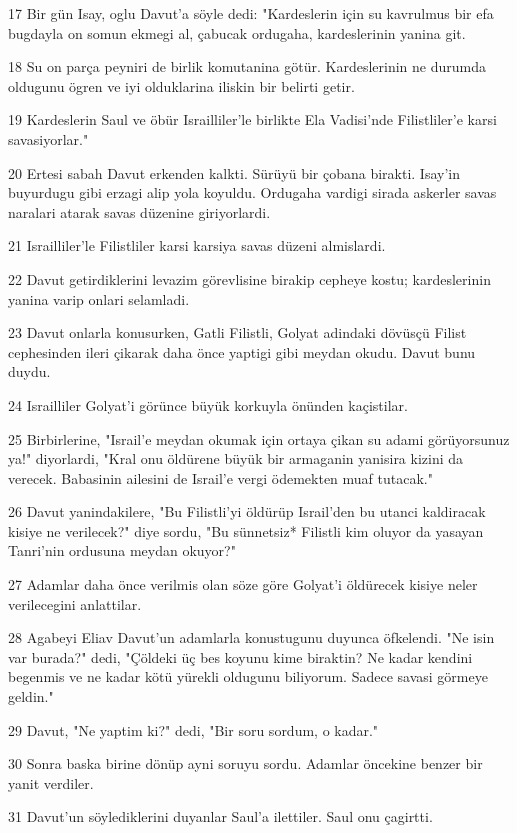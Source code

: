 \par 17 Bir gün Isay, oglu Davut'a söyle dedi: "Kardeslerin için su kavrulmus bir efa bugdayla on somun ekmegi al, çabucak ordugaha, kardeslerinin yanina git.
\par 18 Su on parça peyniri de birlik komutanina götür. Kardeslerinin ne durumda oldugunu ögren ve iyi olduklarina iliskin bir belirti getir.
\par 19 Kardeslerin Saul ve öbür Israilliler'le birlikte Ela Vadisi'nde Filistliler'e karsi savasiyorlar."
\par 20 Ertesi sabah Davut erkenden kalkti. Sürüyü bir çobana birakti. Isay'in buyurdugu gibi erzagi alip yola koyuldu. Ordugaha vardigi sirada askerler savas naralari atarak savas düzenine giriyorlardi.
\par 21 Israilliler'le Filistliler karsi karsiya savas düzeni almislardi.
\par 22 Davut getirdiklerini levazim görevlisine birakip cepheye kostu; kardeslerinin yanina varip onlari selamladi.
\par 23 Davut onlarla konusurken, Gatli Filistli, Golyat adindaki dövüsçü Filist cephesinden ileri çikarak daha önce yaptigi gibi meydan okudu. Davut bunu duydu.
\par 24 Israilliler Golyat'i görünce büyük korkuyla önünden kaçistilar.
\par 25 Birbirlerine, "Israil'e meydan okumak için ortaya çikan su adami görüyorsunuz ya!" diyorlardi, "Kral onu öldürene büyük bir armaganin yanisira kizini da verecek. Babasinin ailesini de Israil'e vergi ödemekten muaf tutacak."
\par 26 Davut yanindakilere, "Bu Filistli'yi öldürüp Israil'den bu utanci kaldiracak kisiye ne verilecek?" diye sordu, "Bu sünnetsiz* Filistli kim oluyor da yasayan Tanri'nin ordusuna meydan okuyor?"
\par 27 Adamlar daha önce verilmis olan söze göre Golyat'i öldürecek kisiye neler verilecegini anlattilar.
\par 28 Agabeyi Eliav Davut'un adamlarla konustugunu duyunca öfkelendi. "Ne isin var burada?" dedi, "Çöldeki üç bes koyunu kime biraktin? Ne kadar kendini begenmis ve ne kadar kötü yürekli oldugunu biliyorum. Sadece savasi görmeye geldin."
\par 29 Davut, "Ne yaptim ki?" dedi, "Bir soru sordum, o kadar."
\par 30 Sonra baska birine dönüp ayni soruyu sordu. Adamlar öncekine benzer bir yanit verdiler.
\par 31 Davut'un söylediklerini duyanlar Saul'a ilettiler. Saul onu çagirtti.
